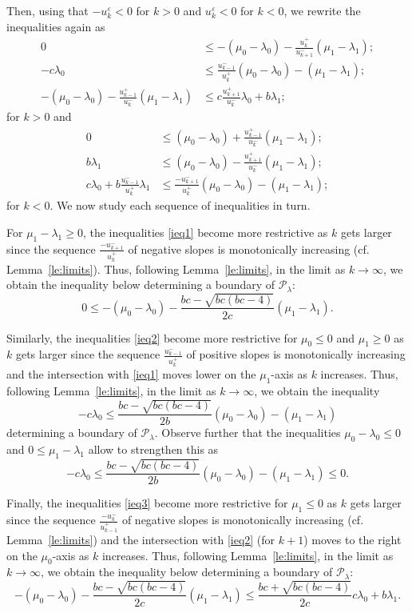 \documentclass[pdflatex,sn-mathphys]{sn-jnl}%
\theoremstyle{thmstyleone}%
\theoremstyle{thmstyletwo}%
\theoremstyle{thmstylethree}%
\newcommand{\cP}{\mathcal{P}}
\begin{document}
  Then, using that $-u_k^\varepsilon<0$ for $k>0$ and $u_k^\varepsilon<0$ for $k<0$, we rewrite the inequalities again as
  \begin{align}
    \label{ieq1} 0 & \le -(\mu_0-\lambda_0)-\frac{u_k^+}{u_{k+1}^-}(\mu_1-\lambda_1);\\
    \label{ieq2} -c\lambda_0 & \le \frac{u_{k-1}^-}{u_k^+}(\mu_0-\lambda_0)-(\mu_1-\lambda_1);\\
    \label{ieq3} -(\mu_0-\lambda_0)-\frac{u_{k-1}^+}{u_k^-}(\mu_1-\lambda_1) &\le c\frac{u_{k+1}^+}{u_k^-}\lambda_0+b\lambda_1;
  \end{align}
  for $k>0$ and
  \begin{align}
    \label{ieq4} 0 &\le (\mu_0-\lambda_0)+\frac{u_{k-1}^+}{u_k^-}(\mu_1-\lambda_1);\\
    \label{ieq5} b\lambda_1 &\le (\mu_0-\lambda_0)-\frac{u_{k+1}^+}{u_k^-}(\mu_1-\lambda_1);\\
    \label{ieq6} c\lambda_0+b\frac{u_{k-1}^-}{u_k^+}\lambda_1 &\le \frac{-u_{k+1}^-}{u_k^+}(\mu_0-\lambda_0)-(\mu_1-\lambda_1);
  \end{align}
  for $k<0$.
  We now study each sequence of inequalities in turn.

  For $\mu_1-\lambda_1\ge 0$, the inequalities \eqref{ieq1} become more restrictive as $k$ gets larger since the sequence $\frac{-u_{k+1}^-}{u_k^+}$ of negative slopes is monotonically increasing (cf. Lemma~\ref{le:limits}).
  Thus, following Lemma~\ref{le:limits}, in the limit as $k\to\infty$, we obtain the inequality below determining a boundary of $\cP_\lambda$:
  \[ 0 \le -(\mu_0-\lambda_0)-\frac{bc-\sqrt{bc(bc-4)}}{2c}(\mu_1-\lambda_1). \]

  Similarly, the inequalities \eqref{ieq2} become more restrictive for $\mu_0\le0$ and $\mu_1\ge0$ as $k$ gets larger since the sequence $\frac{u_{k-1}^-}{u_k^+}$ of positive slopes is monotonically increasing and the intersection with \eqref{ieq1} moves lower on the $\mu_1$-axis as $k$ increases.
  Thus, following Lemma~\ref{le:limits}, in the limit as $k\to\infty$, we obtain the inequality
  \[ -c\lambda_0 \le \frac{bc-\sqrt{bc(bc-4)}}{2b}(\mu_0-\lambda_0)-(\mu_1-\lambda_1) \]
  determining a boundary of $\cP_\lambda$.
  Observe further that the inequalities $\mu_0-\lambda_0 \le 0$ and $0 \le \mu_1-\lambda_1$ allow to strengthen this as
  \[ -c\lambda_0 \le \frac{bc-\sqrt{bc(bc-4)}}{2b}(\mu_0-\lambda_0)-(\mu_1-\lambda_1) \le 0. \]

  Finally, the inequalities \eqref{ieq3} become more restrictive for $\mu_1\le0$ as $k$ gets larger since the sequence $\frac{-u_k^-}{u_{k-1}^+}$ of negative slopes is monotonically increasing (cf. Lemma~\ref{le:limits}) and the intersection with \eqref{ieq2} (for $k+1$) moves to the right on the $\mu_0$-axis as $k$ increases.
  Thus, following Lemma~\ref{le:limits}, in the limit as $k\to\infty$, we obtain the inequality below determining a boundary of $\cP_\lambda$:
  \[ -(\mu_0-\lambda_0)-\frac{bc-\sqrt{bc(bc-4)}}{2c}(\mu_1-\lambda_1) \le \frac{bc+\sqrt{bc(bc-4)}}{2c}c\lambda_0+b\lambda_1. \]
\end{document}
